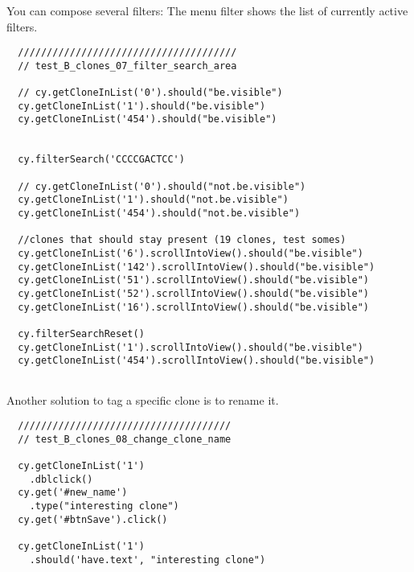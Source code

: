 You can compose several filters:
The menu filter shows the list of currently active filters.

\begin{verbatim}
  //////////////////////////////////////
  // test_B_clones_07_filter_search_area

  // cy.getCloneInList('0').should("be.visible")
  cy.getCloneInList('1').should("be.visible")
  cy.getCloneInList('454').should("be.visible")


  cy.filterSearch('CCCCGACTCC')

  // cy.getCloneInList('0').should("not.be.visible")
  cy.getCloneInList('1').should("not.be.visible")
  cy.getCloneInList('454').should("not.be.visible")

  //clones that should stay present (19 clones, test somes)
  cy.getCloneInList('6').scrollIntoView().should("be.visible")
  cy.getCloneInList('142').scrollIntoView().should("be.visible")
  cy.getCloneInList('51').scrollIntoView().should("be.visible")
  cy.getCloneInList('52').scrollIntoView().should("be.visible")
  cy.getCloneInList('16').scrollIntoView().should("be.visible")

  cy.filterSearchReset()
  cy.getCloneInList('1').scrollIntoView().should("be.visible")
  cy.getCloneInList('454').scrollIntoView().should("be.visible")


\end{verbatim}  
\bigskip

Another solution to tag a specific clone is to rename it.
\begin{verbatim}
  /////////////////////////////////////
  // test_B_clones_08_change_clone_name

  cy.getCloneInList('1')
    .dblclick()
  cy.get('#new_name')
    .type("interesting clone")
  cy.get('#btnSave').click()

  cy.getCloneInList('1')
    .should('have.text', "interesting clone")

\end{verbatim}

\bigskip

